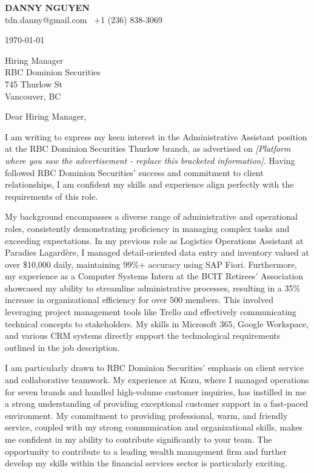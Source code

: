 \documentclass[letterpaper,11pt]{article}
\begin{document}
\textbf{DANNY NGUYEN} \\
tdn.danny@gmail.com \textbullet\ +1 (236) 838-3069 \\
\vspace{20pt}

\today \\
\vspace{20pt}

Hiring Manager \\
RBC Dominion Securities \\
745 Thurlow St \\
Vancouver, BC \\
\vspace{20pt}

Dear Hiring Manager, \\
\vspace{10pt}

I am writing to express my keen interest in the Administrative Assistant position at the RBC Dominion Securities Thurlow branch, as advertised on \textit{[Platform where you saw the advertisement -  replace this bracketed information]}.  Having followed RBC Dominion Securities' success and commitment to client relationships, I am confident my skills and experience align perfectly with the requirements of this role.

\vspace{10pt}

My background encompasses a diverse range of administrative and operational roles, consistently demonstrating proficiency in managing complex tasks and exceeding expectations.  In my previous role as Logistics Operations Assistant at Paradies Lagardère, I managed detail-oriented data entry and inventory valued at over \$10,000 daily, maintaining 99\%+ accuracy using SAP Fiori.  Furthermore, my experience as a Computer Systems Intern at the BCIT Retirees’ Association showcased my ability to streamline administrative processes, resulting in a 35\% increase in organizational efficiency for over 500 members. This involved leveraging project management tools like Trello and effectively communicating technical concepts to stakeholders.  My skills in Microsoft 365, Google Workspace, and various CRM systems directly support the technological requirements outlined in the job description.

\vspace{10pt}

I am particularly drawn to RBC Dominion Securities' emphasis on client service and collaborative teamwork. My experience at Kozu, where I managed operations for seven brands and handled high-volume customer inquiries, has instilled in me a strong understanding of providing exceptional customer support in a fast-paced environment. My commitment to providing professional, warm, and friendly service, coupled with my strong communication and organizational skills, makes me confident in my ability to contribute significantly to your team.  The opportunity to contribute to a leading wealth management firm and further develop my skills within the financial services sector is particularly exciting.
\end{document}
